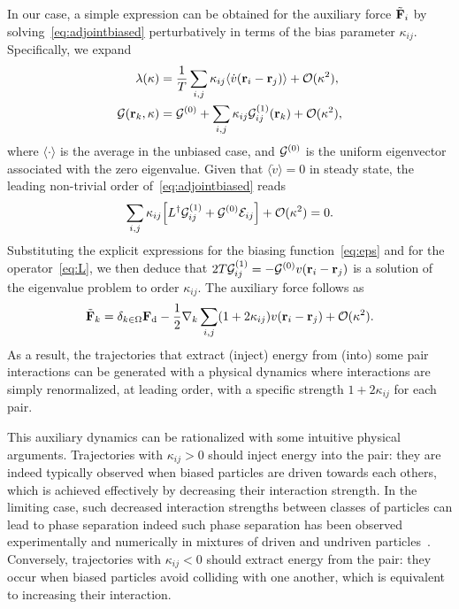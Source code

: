\documentclass[pre, superscriptaddress, twocolumn,pre]{revtex4-1}
\begin{document}
In our case, a simple expression can be obtained for the auxiliary force $\tilde{\bf F}_i$  by solving~\eqref{eq:adjointbiased} perturbatively in terms of the bias parameter $\kappa_{ij}$. Specifically, we expand
\begin{equation}
	\begin{aligned}
		\lambda(\kappa) &= \frac{1}{T} \sum_{i,j}\kappa_{ij}\langle\dot v({\bf r}_i- {\bf r}_j)\rangle + {\cal O}(\kappa^2) ,
		\\
		{\cal G}({\bf r}_k,\kappa) &= {\cal G}^{(0)} + \sum_{i,j}\kappa_{ij}{\cal G}_{ij}^{(1)}({\bf r}_k) + {\cal O}(\kappa^2) ,
	\end{aligned}
\end{equation}
where $\langle\cdot\rangle$ is the average in the unbiased case, and ${\cal G}^{(0)}$ is the uniform eigenvector associated with the zero eigenvalue. Given that $\langle\dot v\rangle=0$ in steady state, the leading non-trivial order of~\eqref{eq:adjointbiased} reads
\begin{equation}
	\sum_{i,j}\kappa_{ij}\Big[L^\dagger{\cal G}_{ij}^{(1)} + {\cal G}^{(0)} {\cal E}_{ij}\Big] + {\cal O}(\kappa^2) = 0 .
\end{equation}
Substituting the explicit expressions for the biasing function~\eqref{eq:eps} and for the operator~\eqref{eq:L}, we then deduce that $2T{\cal G}_{ij}^{(1)}=-{\cal G}^{(0)} v({\bf r}_i-{\bf r}_j)$ is a solution of the eigenvalue problem to order $\kappa_{ij}$. The auxiliary force follows as
\begin{equation}\label{eq:F}
	\tilde{\bf F}_k = \delta_{k\in\Omega}{\bf F}_{\rm d} - \frac{1}{2}\nabla_k\sum_{i,j}(1+2\kappa_{ij}) v({\bf r}_i-{\bf r}_j) + {\cal O}(\kappa^2) .
\end{equation}
As a result, the trajectories that extract (inject) energy from (into) some pair interactions can be generated with a physical dynamics where interactions are simply renormalized, at leading order, with a specific strength $1+2\kappa_{ij}$ for each pair.


This auxiliary dynamics can be rationalized with some intuitive physical arguments. Trajectories with $\kappa_{ij}>0$ should inject energy into the pair: they are indeed typically observed when biased particles are driven towards each others, which is achieved effectively by decreasing their interaction strength. In the limiting case, such decreased interaction strengths between classes of particles can lead to phase separation \textendash indeed such phase separation has been observed experimentally and numerically in mixtures of driven and undriven particles~\cite{delJunco2018,Han2016}. Conversely, trajectories with $\kappa_{ij}<0$ should extract energy from the pair: they occur when biased particles avoid colliding with one another, which is equivalent to increasing their interaction. 
\end{document}
